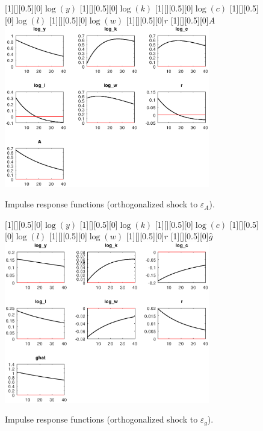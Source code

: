  
\begin{figure}[H]
[1][][0.5][0]{${\log(y)}$}
[1][][0.5][0]{${\log(k)}$}
[1][][0.5][0]{${\log(c)}$}
[1][][0.5][0]{${\log(l)}$}
[1][][0.5][0]{${\log(w)}$}
[1][][0.5][0]{${r}$}
[1][][0.5][0]{${A}$}
\centering 
\includegraphics[width=0.80\textwidth]{RBC_baseline_IRF_eps_A}
\caption{Impulse response functions (orthogonalized shock to ${\varepsilon_A}$).}
\label{Fig:IRF:eps_A}
\end{figure}
 
\begin{figure}[H]
[1][][0.5][0]{${\log(y)}$}
[1][][0.5][0]{${\log(k)}$}
[1][][0.5][0]{${\log(c)}$}
[1][][0.5][0]{${\log(l)}$}
[1][][0.5][0]{${\log(w)}$}
[1][][0.5][0]{${r}$}
[1][][0.5][0]{${\hat g}$}
\centering 
\includegraphics[width=0.80\textwidth]{RBC_baseline_IRF_eps_g}
\caption{Impulse response functions (orthogonalized shock to ${\varepsilon_g}$).}
\label{Fig:IRF:eps_g}
\end{figure}
 
 
